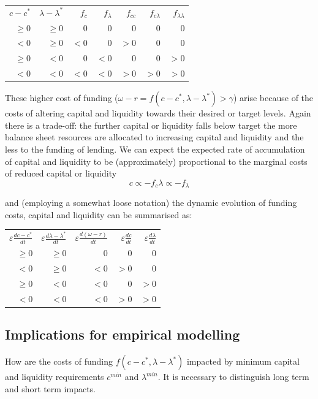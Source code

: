 \documentclass[
  12,
]{article}
\begin{document}
\begin{center}
\begin{tabular}{ r r r r r r r}
$c-c^\ast$&$\lambda-\lambda^\ast$&$f_c$&$f_\lambda$&$f_{cc}$&$f_{c\lambda}$&$f_{\lambda\lambda}$\\
$\geq 0$&$\geq 0$&$0$&$0$&$0$&$0$&$0$\\
$<0$&$\geq 0$&$<0$&$0$&$>0$&$0$&$0$\\
$\geq 0$&$<0$&$0$&$<0$&$0$&$0$&$>0$\\
$<0$&$<0$&$<0$&$<0$&$>0$&$>0$&$>0$
\end{tabular}
\end{center}

These higher cost of funding (\(\omega - r = f(c-c^\ast,\lambda-\lambda^\ast )>\gamma\)) arise because of the costs of altering capital and liquidity towards their desired or target levels. Again there is a trade-off: the further capital or liquidity falls below target the more balance sheet resources are allocated to increasing capital and liquidity and the less to the funding of lending. We can expect the expected rate of accumulation of capital and liquidity to be (approximately) proportional to the marginal costs of reduced capital or liquidity
\[
c \propto -f_c
\lambda \propto -f_\lambda
\]

and (employing a somewhat loose notation) the dynamic evolution of funding costs, capital and liquidity can be summarised as:

\begin{center}
\begin{tabular}{ r r r r r}
$\varepsilon\frac{{d}c-c^\ast}{{d}t}$&
$\varepsilon\frac{{d}\lambda-\lambda^\ast}{{d}t}$&
$\varepsilon\frac{{d}(\omega- r)}{{d}t}$&
$\varepsilon\frac{{d}c}{{d}t}$&
$\varepsilon\frac{{d}\lambda}{{d}t} $\\
$\geq 0$&$\geq 0$&$0$&$0$&$0$\\
$<0$&$\geq 0$&$<0$&$>0$&$0$\\
$\geq 0$&$<0$&$<0$&$0$&$>0$\\
$<0$&$<0$&$<0$&$>0$&$>0$
\end{tabular}
\end{center}

\hypertarget{implications-for-empirical-modelling}{%
\subsection{Implications for empirical modelling}\label{implications-for-empirical-modelling}}

How are the costs of funding \(f(c-c^\ast,\lambda-\lambda^\ast)\) impacted by minimum capital and liquidity requirements \(c^{min}\) and \(\lambda^{min}\). It is necessary to distinguish long term and short term impacts.
\end{document}
